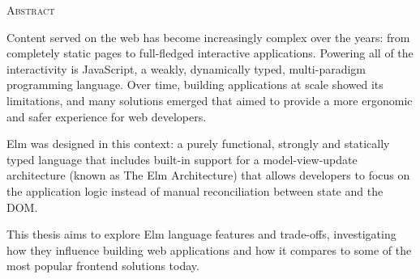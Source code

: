 \begin{center}
  \textsc{Abstract}
\end{center}
\noindent

Content served on the web has become increasingly complex over the years: from completely static pages to full-fledged interactive applications. Powering all of the interactivity is JavaScript, a weakly, dynamically typed, multi-paradigm programming language. Over time, building applications at scale showed its limitations, and many solutions emerged that aimed to provide a more ergonomic and safer experience for web developers.

Elm was designed in this context: a purely functional, strongly and statically typed language that includes built-in support for a model-view-update architecture (known as The Elm Architecture) that allows developers to focus on the application logic instead of manual reconciliation between state and the DOM.

This thesis aims to explore Elm language features and trade-offs, investigating how they influence building web applications and how it compares to some of the most popular frontend solutions today.
